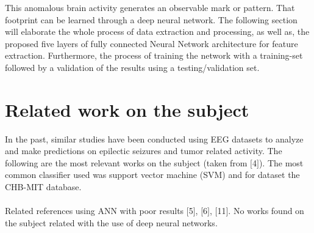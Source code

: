 \documentclass{llncs}       %
\begin{document}
This anomalous brain activity generates an observable mark or pattern. That footprint can be learned through a deep neural network. The following section will elaborate the whole process of data extraction and processing, as well as, the proposed five layers of fully connected Neural Network architecture for feature extraction. Furthermore, the process of training the network with a training-set followed by a validation of the results using a testing/validation set. 

\paragraph{}\paragraph{}

\section{Related work on the subject}
\label{sec:1}

In the past, similar studies have been conducted using EEG datasets to analyze and make predictions on epilectic seizures and tumor related activity. 
The following are the most relevant works on the subject (taken from $[$4$]$). The most common classifier 
used was support vector machine (SVM) and for dataset the CHB-MIT 
database. 


\paragraph{}
Related references using ANN with poor results $[$5$]$, $[$6$]$, 
$[$11$]$. No works found on the subject related with the use of deep neural networks.

\paragraph{}
\paragraph{}
\paragraph{}



\paragraph{}
\end{document}
